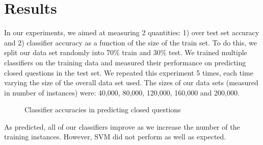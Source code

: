 \documentclass[11pt]{article}
\begin{document}
\section{Results}
In our experiments, we aimed at measuring 2 quantities: 1) over test
set accuracy and 2) classifier accuracy as a function of the size of
the train set.  To do this, we split our data set randomly into 70\%
train and 30\% test.  We trained multiple classifiers on the training
data and measured their performance on predicting closed questions in
the test set.  We repeated this experiment 5 times, each time varying
the size of the overall data set used.  The sizes of our data sets
(measured in number of instances) were: 40,000, 80,000, 120,000,
160,000 and 200,000.

\begin{figure}
\centering
{}
\caption{Classifier accuracies in predicting closed questions}
\label{fig:results}
\end{figure}

As predicted, all of our classifiers improve as we increase the number
of the training instances. However, SVM did not perform as well as
expected.
\end{document}
